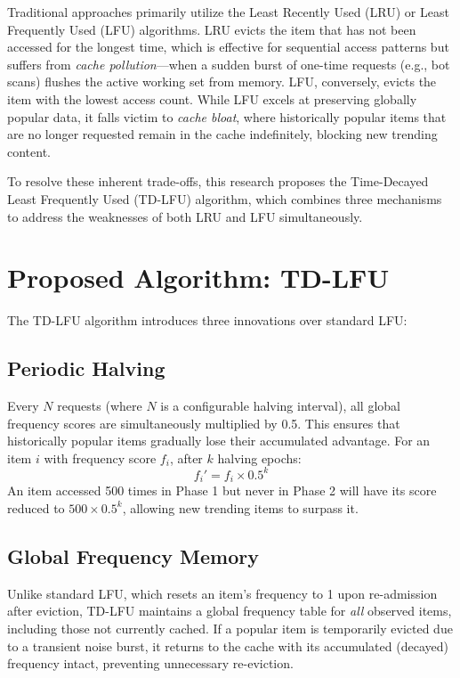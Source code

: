 \documentclass[conference]{IEEEtran}
\begin{document}
Traditional approaches primarily utilize the Least Recently Used (LRU) or Least Frequently Used (LFU) algorithms. LRU evicts the item that has not been accessed for the longest time, which is effective for sequential access patterns but suffers from \textit{cache pollution}---when a sudden burst of one-time requests (e.g., bot scans) flushes the active working set from memory. LFU, conversely, evicts the item with the lowest access count. While LFU excels at preserving globally popular data, it falls victim to \textit{cache bloat}, where historically popular items that are no longer requested remain in the cache indefinitely, blocking new trending content.

To resolve these inherent trade-offs, this research proposes the Time-Decayed Least Frequently Used (TD-LFU) algorithm, which combines three mechanisms to address the weaknesses of both LRU and LFU simultaneously.

\section{Proposed Algorithm: TD-LFU}
The TD-LFU algorithm introduces three innovations over standard LFU:

\subsection{Periodic Halving}
Every $N$ requests (where $N$ is a configurable halving interval), all global frequency scores are simultaneously multiplied by 0.5. This ensures that historically popular items gradually lose their accumulated advantage. For an item $i$ with frequency score $f_i$, after $k$ halving epochs:
\begin{equation}
f_i' = f_i \times 0.5^k
\end{equation}
An item accessed 500 times in Phase 1 but never in Phase 2 will have its score reduced to $500 \times 0.5^k$, allowing new trending items to surpass it.

\subsection{Global Frequency Memory}
Unlike standard LFU, which resets an item's frequency to 1 upon re-admission after eviction, TD-LFU maintains a global frequency table for \textit{all} observed items, including those not currently cached. If a popular item is temporarily evicted due to a transient noise burst, it returns to the cache with its accumulated (decayed) frequency intact, preventing unnecessary re-eviction.
\end{document}
